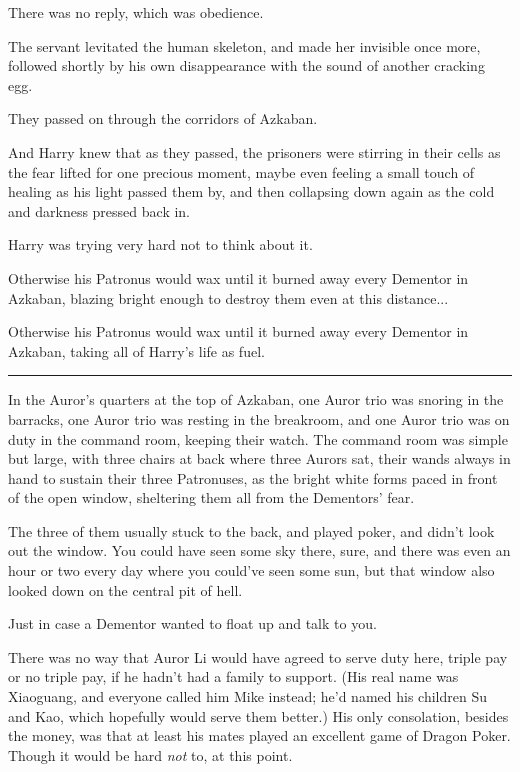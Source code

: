 There was no reply, which was obedience.

The servant levitated the human skeleton, and made her invisible once more, followed shortly by his own disappearance with the sound of another cracking egg.

They passed on through the corridors of Azkaban.

And Harry knew that as they passed, the prisoners were stirring in their cells as the fear lifted for one precious moment, maybe even feeling a small touch of healing as his light passed them by, and then collapsing down again as the cold and darkness pressed back in.

Harry was trying very hard not to think about it.

Otherwise his Patronus would wax until it burned away every Dementor in Azkaban, blazing bright enough to destroy them even at this distance...

Otherwise his Patronus would wax until it burned away every Dementor in Azkaban, taking all of Harry's life as fuel.

\begin{center}\rule{3in}{0.4pt}\end{center}

In the Auror's quarters at the top of Azkaban, one Auror trio was snoring in the barracks, one Auror trio was resting in the breakroom, and one Auror trio was on duty in the command room, keeping their watch. The command room was simple but large, with three chairs at back where three Aurors sat, their wands always in hand to sustain their three Patronuses, as the bright white forms paced in front of the open window, sheltering them all from the Dementors' fear.

The three of them usually stuck to the back, and played poker, and didn't look out the window. You could have seen some sky there, sure, and there was even an hour or two every day where you could've seen some sun, but that window also looked down on the central pit of hell.

Just in case a Dementor wanted to float up and talk to you.

There was no way that Auror Li would have agreed to serve duty here, triple pay or no triple pay, if he hadn't had a family to support. (His real name was Xiaoguang, and everyone called him Mike instead; he'd named his children Su and Kao, which hopefully would serve them better.) His only consolation, besides the money, was that at least his mates played an excellent game of Dragon Poker. Though it would be hard \emph{not} to, at this point.

